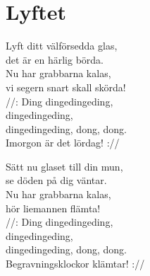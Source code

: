 \section{Lyftet}
Lyft ditt välförsedda glas,\\
det är en härlig börda.\\
Nu har grabbarna kalas,\\
vi segern snart skall skörda!\\

//: Ding dingedingeding,\\
dingedingeding,\\
dingedingeding, dong, dong.\\
Imorgon är det lördag! ://

Sätt nu glaset till din mun,\\
se döden på dig väntar.\\
Nu har grabbarna kalas,\\
hör liemannen flämta!\\

//: Ding dingedingeding,\\
dingedingeding,\\
dingedingeding, dong, dong.\\
Begravningsklockor klämtar! ://\\